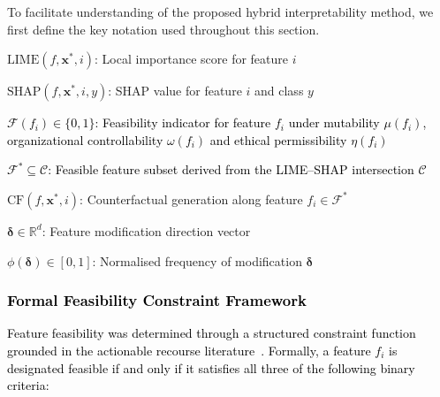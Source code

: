 \documentclass[a4paper,fleqn]{cas-sc}
\begin{document}
To facilitate understanding of the proposed hybrid interpretability method, we first define the key notation used throughout this section.

\begin{itemize}
    \item $\text{LIME}(f, \mathbf{x}^*, i)$: Local importance score for feature $i$
    \item $\text{SHAP}(f, \mathbf{x}^*, i, y)$: SHAP value for feature $i$ and class $y$
    \textcolor{black}{\item $\mathcal{F}(f_i) \in \{0,1\}$: Feasibility indicator for feature $f_i$ under mutability $\mu(f_i)$, organizational controllability $\omega(f_i)$ and ethical permissibility $\eta(f_i)$}
    \textcolor{black}{\item $\mathcal{F}^* \subseteq \mathcal{C}$: Feasible feature subset derived from the LIME--SHAP intersection $\mathcal{C}$}
    \item $\text{CF}(f, \mathbf{x}^*, i)$: Counterfactual generation along feature $f_i \in \mathcal{F}^*$
    \item $\boldsymbol{\delta} \in \mathbb{R}^d$: Feature modification direction vector
    \item $\phi(\boldsymbol{\delta}) \in [0, 1]$: Normalised frequency of modification $\boldsymbol{\delta}$
\end{itemize}

\subsubsection*{\textcolor{black}{Formal Feasibility Constraint Framework}}
\label{subsec:formal_feasibility}
\textcolor{black}{Feature feasibility was determined through a structured constraint function grounded in the actionable recourse literature~\cite{ustun2019actionable, karimi2021algorithmic}. Formally, a feature $f_i$ is designated feasible if and only if it satisfies all three of the following binary criteria:}
\end{document}
